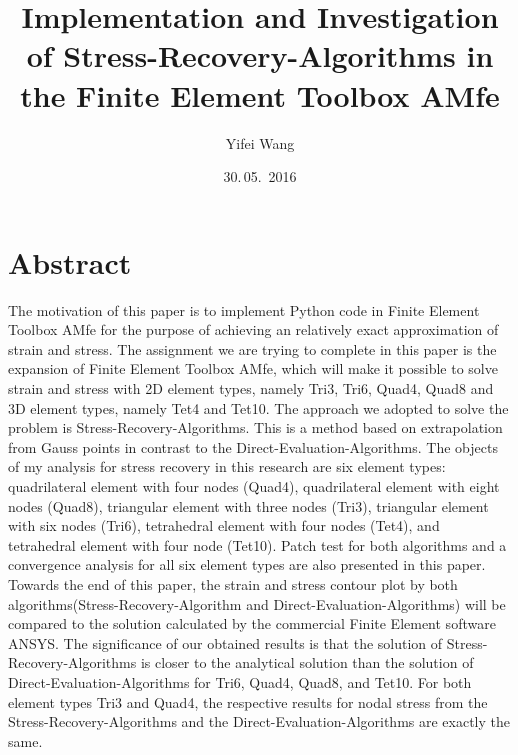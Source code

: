 \documentclass[nenglish]{AMsemesterArbeit}
\author{Yifei Wang}
\title{%
	Implementation and Investigation of Stress-Recovery-Algorithms in the Finite Element Toolbox AMfe
	}
\date{30.\,05.~2016}
\begin{document}
\renewcommand{\arraystretch}{2.5}
\frontmatter
\maketitle
\section*{Abstract}
The motivation of this paper is to implement Python code in Finite Element Toolbox AMfe for the purpose of achieving an relatively exact approximation of strain and stress. The assignment we are trying to complete in this paper is the expansion of Finite Element Toolbox AMfe, which will make it possible to solve strain and stress with 2D element types, namely Tri3, Tri6, Quad4, Quad8 and 3D element types, namely Tet4 and Tet10. The approach we adopted to solve the problem is Stress-Recovery-Algorithms. This is a method based on extrapolation from Gauss points in contrast to the Direct-Evaluation-Algorithms. The objects of my analysis for stress recovery in this research are six element types: quadrilateral element with four nodes (Quad4), quadrilateral element with eight nodes (Quad8), triangular element with three nodes (Tri3), triangular element with six nodes (Tri6), tetrahedral element with four nodes (Tet4), and tetrahedral element with four node (Tet10). Patch test for both algorithms and a convergence analysis for all six element types are also presented in this paper. Towards the end of this paper, the strain and stress contour plot by both algorithms(Stress-Recovery-Algorithm and Direct-Evaluation-Algorithms) will be compared to the solution calculated by the commercial Finite Element software ANSYS. The significance of our obtained results is that the solution of Stress-Recovery-Algorithms is closer to the analytical solution than the solution of Direct-Evaluation-Algorithms for Tri6, Quad4, Quad8, and Tet10. For both element types Tri3 and Quad4, the respective results for nodal stress from the Stress-Recovery-Algorithms and the Direct-Evaluation-Algorithms are exactly the same.



\PrintTablesAndListsOfContents
\mainmatter

\backmatter
\AMPrintBibliography
\end{document}
